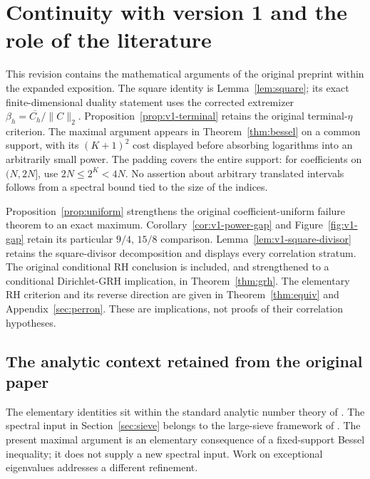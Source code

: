 \section{Continuity with version 1 and the role of the literature}
\label{app:v1-record}

This revision contains the mathematical arguments of the original
preprint \cite{v1} within the expanded exposition. The square
identity is Lemma~\ref{lem:square}; its exact finite-dimensional
duality statement uses the corrected extremizer
\(\beta_h=\overline{C_h}/\|C\|_2\).
Proposition~\ref{prop:v1-terminal} retains the original
terminal-\(\eta\) criterion. The maximal argument appears in
Theorem~\ref{thm:bessel} on a common support, with its
\((K+1)^2\) cost displayed before absorbing logarithms into
an arbitrarily small power. The padding covers the entire
support: for coefficients on \((N,2N]\), use
\(2N\le2^K<4N\). No assertion about arbitrary translated
intervals follows from a spectral bound tied to the size of
the indices.

Proposition~\ref{prop:uniform} strengthens the original
coefficient-uniform failure theorem to an exact maximum.
Corollary~\ref{cor:v1-power-gap} and Figure~\ref{fig:v1-gap}
retain its particular \(9/4\), \(15/8\) comparison.
Lemma~\ref{lem:v1-square-divisor} retains the square-divisor
decomposition and displays every correlation stratum. The
original conditional RH conclusion is included, and strengthened
to a conditional Dirichlet-GRH implication, in
Theorem~\ref{thm:grh}. The elementary RH criterion and its
reverse direction are given in Theorem~\ref{thm:equiv} and
Appendix~\ref{sec:perron}. These are implications, not proofs
of their correlation hypotheses.

\subsection{The analytic context retained from the original paper}

The elementary identities sit within the standard analytic
number theory of \cite{apostol,iwaniec-kowalski,titchmarsh}.
The spectral input in Section~\ref{sec:sieve} belongs to the
large-sieve framework of
\cite{di,iwaniec-spectral,friedlander-iwaniec,bombieri,montgomery}.
The present maximal argument is an elementary consequence of a
fixed-support Bessel inequality; it does not supply a new spectral
input. Work on exceptional eigenvalues \cite{pascadi} addresses
a different refinement.

